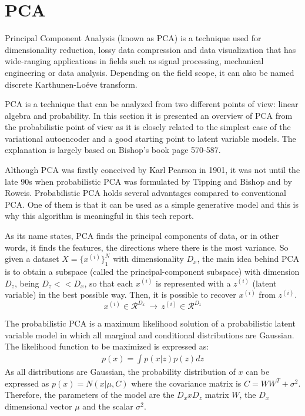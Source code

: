 

\section{PCA}

Principal Component Analysis (known as PCA) \cite{Shlens2014} is a technique used for 
dimensionality reduction, lossy data compression and data visualization that has 
wide-ranging applications in fields such as signal processing, mechanical engineering or 
data analysis.
Depending on the field scope, it can also be named discrete Karthunen-Loéve transform.

PCA is a technique that can be analyzed from two different points of view: linear
algebra and probability. In this section it is presented an overview of PCA from the
probabilistic point of view as it is closely related to the simplest case of the variational
autoencoder and a good starting point to latent variable models. The explanation is largely
based on Bishop's book \cite{Bishop2006} page 570-587.

Although PCA was firstly conceived by Karl Pearson in 1901, it was not until
the late 90s when probabilistic PCA was formulated by Tipping and Bishop and
by Roweis. Probabilistic PCA holds several advantages compared to conventional
PCA. One of them is that it can be used as a simple generative model and this is why this
algorithm is meaningful in this tech report.

As its name states, PCA finds the principal components of data, or in other words,
it finds the features, the directions where there is the most variance. So given a dataset 
$X = \{x^{(i)}\}^N_1$ with dimensionality $D_x$, the main idea behind PCA is to obtain a subspace
(called the principal-component subspace) with dimension $D_z$, being $D_z << D_x$, so that
each $x^{(i)}$ is represented with a $z^{(i)}$ (latent variable) in the best possible way. Then, it is
possible to recover $x^{(i)}$ from $z^{(i)}$.
$$
x^{(i)} \in \mathcal{R}^{D_x} \, \rightarrow \, z^{(i)} \in \mathcal{R}^{D_z}
$$

The probabilistic PCA is a maximum likelihood solution of a probabilistic latent variable model in 
which all marginal and conditional distributions are Gaussian. The likelihood function to be 
maximized is expressed as:
\begin{align}
p(x) = \int p(x | z) p(z) dz
\end{align}
As all distributions are Gaussian, the probability distribution of $x$ can be expressed
as $p(x) = N(x | \mu, C)$ where the covariance matrix is $C = WW^T + \sigma^2$. Therefore, 
the parameters of the model are the $D_x x D_z$ matrix $W$, the $D_x$ dimensional vector 
$\mu$ and the scalar $\sigma^2$.



